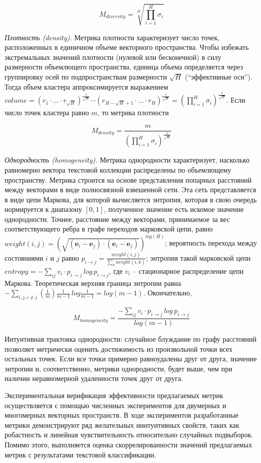 \[M_{diversity} = \sqrt[H]{\prod_{i=1}^{H}\sigma_i}\]

\textit{Плотность (density).} Метрика плотности характеризует число точек, расположенных в единичном объеме векторного пространства. Чтобы избежать экстремальных значений плотности (нулевой или бесконечной) в силу размерности объемлющего пространства, единица объема определяется через группировку осей по подпространствам размерности $\sqrt{H}$ (``эффективные оси''). Тогда объем кластера аппроксимируется выражением $volume = (r_1 \cdot \ldots \cdot r_{\sqrt{H}})^{\frac{1}{\sqrt{H}}} \cdots (r_{H-\sqrt{H}+1} \cdot \ldots \cdot r_{H})^{\frac{1}{\sqrt{H}}} = (\prod_{i=1}^{H}\sigma_i)^{\frac{1}{\sqrt{H}}}$. Если число точек кластера равно $m$, то метрика плотности

\[M_{density}=\frac{m}{(\prod_{i=1}^{H}\sigma_i)^{\frac{1}{\sqrt{H}}}}\]

\textit{Однородность (homogeneity).} Метрика однородности характеризует, насколько равномерно вектора текстовой коллекции распределены по объемлющему пространству. Метрика строится на основе представления попарных расстояний между векторами в виде полносвязной взвешенной сети. Эта сеть представляется в виде цепи Маркова, для которой вычисляется энтропия, которая в свою очередь нормируется к диапазону $[0, 1]$, полученное значение есть искомое значение однородности. Точнее, расстояние между векторами, принимаемое за вес соответствующего ребра в графе переходов марковской цепи, равно $weight(i,j) = (\sqrt{(\bm{e}_i - \bm{e}_j)\cdot(\bm{e}_i - \bm{e}_j)})^{log(H)}$; вероятность перехода между состояниями $i$ и $j$ равно $p_{i \to j} = \frac{weight(i, j)}{\sum_k weight(i,k)}$; энтропия такой марковской цепи $entropy= -\sum_{ij}v_i \cdot p_{i\to j}\,log\,p_{i\to j}$, где $v_i$ -- стационарное распределение цепи Маркова. Теоретическая верхняя граница энтропии равна $-\sum_{i,j,i\neq j}(\frac{1}{m})\frac{1}{m-1}\,log\frac{1}{m-1} = log(m-1)$. Окончательно,

\[M_{homogeneity} = \frac{-\sum_{ij}v_i \cdot p_{i\to j}\,log\,p_{i\to j}}{log(m-1)}\]

\noindent Интуитивная трактовка однородности: случайное блуждание по графу расстояний позволяет метрически оценить достижимость из произвольной точки всех остальных точек. Если все точки примерно равноудалены друг от друга, значение энтропии и, соответственно, метрики однородности, будет выше, чем при наличии неравномерной удаленности точек друг от друга. 

Экспериментальная верификация эффективности предлагаемых метрик осуществляется с помощью численных экспериментов для двумерных и многомерных векторных пространств. В ходе экспериментов разработанные метрики демонстрируют ряд желательных иинтуитивных свойств, таких как робастность и линейная чувствительность относительно случайных подвыборок. Помимо этого, выполняется оценка скоррелированности значений предлагаемых метрик с результатами текстовой классификации.

